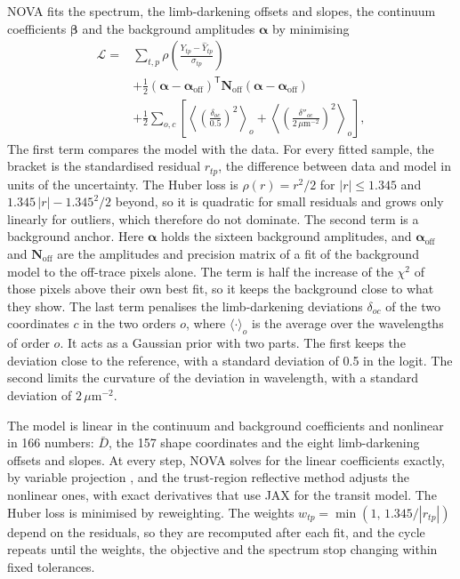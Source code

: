 NOVA fits the spectrum, the limb-darkening offsets and slopes, the continuum
coefficients $\bm{\beta}$ and the background amplitudes $\bm{\alpha}$ by
minimising
\begin{equation}
\begin{split}
 \mathcal{L} ={}& \sum_{t,p}\rho\!\left(\frac{Y_{tp}-\widehat Y_{tp}}{\sigma_{tp}}\right)\\
 &+\frac{1}{2}(\bm{\alpha}-\bm{\alpha}_{\mathrm{off}})^{\mathsf T}
   \bm{N}_{\mathrm{off}}(\bm{\alpha}-\bm{\alpha}_{\mathrm{off}}) \\
 &+\frac{1}{2}\sum_{o,c}\left[\left\langle\left(\frac{\delta_{oc}}{0.5}\right)^{2}\right\rangle_{o}
 +\left\langle\left(\frac{\delta''_{oc}}{2\,\mu\mathrm{m}^{-2}}\right)^{2}\right\rangle_{o}\right],
\end{split}
 \label{eq:objective}
\end{equation}
The first term compares the model with the data. For every fitted sample, the
bracket is the standardised residual $r_{tp}$, the difference between data and
model in units of the uncertainty. The Huber loss is $\rho(r)=r^2/2$ for
$|r|\leq1.345$ and $1.345\,|r|-1.345^2/2$ beyond, so it is quadratic for small
residuals and grows only linearly for outliers, which therefore do not
dominate. The second term is a background anchor. Here $\bm{\alpha}$ holds the
sixteen background amplitudes, and $\bm{\alpha}_{\mathrm{off}}$ and
$\bm{N}_{\mathrm{off}}$ are the amplitudes and precision matrix of a fit of
the background model to the off-trace pixels alone. The term is half the
increase of the $\chi^2$ of those pixels above their own best fit, so it keeps
the background close to what they show.
The last term penalises the limb-darkening deviations $\delta_{oc}$ of the two
coordinates $c$ in the two orders $o$, where $\langle\cdot\rangle_o$ is the
average over the wavelengths of order $o$. It acts as a Gaussian prior with
two parts. The first keeps the deviation close to the reference, with a
standard deviation of 0.5 in the logit. The second limits the curvature of the
deviation in wavelength, with a standard deviation of $2\,\mu\mathrm{m}^{-2}$.

The model is linear in the continuum and background coefficients and
nonlinear in 166 numbers: $\bar D$, the 157 shape coordinates and the eight
limb-darkening offsets and slopes. At every step, NOVA solves for the linear
coefficients exactly, by variable projection \citep{GolubPereyra1973}, and
the trust-region reflective method \citep{BranchColemanLi1999} adjusts the
nonlinear ones, with exact derivatives that use JAX for the transit model. The
Huber loss is minimised by reweighting. The weights
$w_{tp}=\min(1,\,1.345/|r_{tp}|)$ depend on the residuals, so they are
recomputed after each fit, and the cycle repeats until the weights, the
objective and the spectrum stop changing within fixed tolerances.

